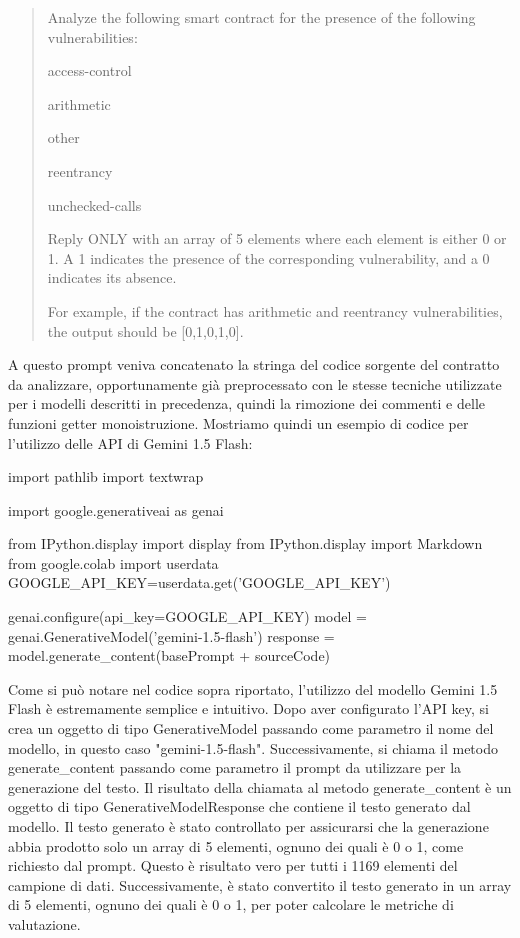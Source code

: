 \documentclass[../../Thesis.tex]{subfiles}
\begin{document}
\begin{quote}
Analyze the following smart contract for the presence of the following vulnerabilities:

access-control 

arithmetic

other

reentrancy

unchecked-calls

Reply ONLY with an array of 5 elements where each element is either 0 or 1. A 1 indicates the presence of the corresponding vulnerability, and a 0 indicates its absence.

For example, if the contract has arithmetic and reentrancy vulnerabilities, the output should be [0,1,0,1,0].
\end{quote}   
A questo prompt veniva concatenato la stringa del codice sorgente del contratto da analizzare, opportunamente già preprocessato con le stesse tecniche utilizzate per i modelli descritti in precedenza, quindi la rimozione dei commenti e delle funzioni getter monoistruzione. Mostriamo quindi un esempio di codice per l'utilizzo delle API di Gemini 1.5 Flash:
\begin{python}
import pathlib
import textwrap

import google.generativeai as genai

from IPython.display import display
from IPython.display import Markdown
from google.colab import userdata
GOOGLE_API_KEY=userdata.get('GOOGLE_API_KEY')

genai.configure(api_key=GOOGLE_API_KEY)
model = genai.GenerativeModel('gemini-1.5-flash')
response = model.generate_content(basePrompt + sourceCode)
\end{python}

Come si può notare nel codice sopra riportato, l'utilizzo del modello Gemini 1.5 Flash è estremamente semplice e intuitivo. Dopo aver configurato l'API key, si crea un oggetto di tipo GenerativeModel passando come parametro il nome del modello, in questo caso "gemini-1.5-flash". Successivamente, si chiama il metodo generate\_content passando come parametro il prompt da utilizzare per la generazione del testo. Il risultato della chiamata al metodo generate\_content è un oggetto di tipo GenerativeModelResponse che contiene il testo generato dal modello. 
Il testo generato è stato controllato per assicurarsi che la generazione abbia prodotto solo un array di 5 elementi, ognuno dei quali è 0 o 1, come richiesto dal prompt. Questo è risultato vero per tutti i 1169 elementi del campione di dati. Successivamente, è stato convertito il testo generato in un array di 5 elementi, ognuno dei quali è 0 o 1, per poter calcolare le metriche di valutazione.
\end{document}
